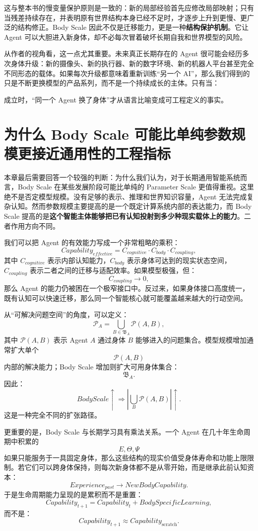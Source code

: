 这与整本书的慢变量保护原则是一致的：新的局部经验首先应修改局部映射；只有当残差持续存在，并表明原有世界结构本身已经不足时，才逐步上升到更慢、更广泛的结构修正。Body Scale 因此不仅是迁移能力，更是一种\textbf{结构保护机制}。它让 Agent 可以大胆进入新身体，却不必每次冒着破坏长期自我和世界模型的风险。

从作者的视角看，这一点尤其重要。未来真正长期存在的 Agent 很可能会经历多次身体升级：新的摄像头、新的执行器、新的数字环境、新的机器人平台甚至完全不同形态的载体。如果每次升级都意味着重新训练“另一个 AI”，那么我们得到的只是不断更换模型的产品系列，而不是一个持续成长的主体。只有当：
\begin{statementbox}
\centering
{}
\end{statementbox}
成立时，“同一个 Agent 换了身体”才从语言比喻变成可工程定义的事实。


\section{为什么 Body Scale 可能比单纯参数规模更接近通用性的工程指标}

本章最后需要回答一个较强的判断：为什么我们认为，对于长期通用智能系统而言，Body Scale 在某些发展阶段可能比单纯的 Parameter Scale 更值得重视。这里绝不是否定模型规模。没有足够的表示、推理和世界知识容量，Agent 无法完成复杂认知。然而参数规模主要提高的是一个既定计算系统内部的表达能力，而 Body Scale 提高的是\textbf{这个智能主体能够把已有认知投射到多少种现实载体上的能力}。二者作用方向不同。

我们可以把 Agent 的有效能力写成一个非常粗略的乘积：
\[
Capability_{effective}
=
C_{cognitive}
\cdot
C_{body}
\cdot
C_{coupling},
\]
其中 $C_{cognitive}$ 表示内部认知能力，$C_{body}$ 表示身体可达到的现实状态空间，$C_{coupling}$ 表示二者之间的迁移与适配效率。如果模型极强，但：
\[
C_{coupling}\rightarrow0,
\]
那么 Agent 的能力仍被困在一个极窄接口中。反过来，如果身体接口高度统一，既有认知可以快速迁移，那么同一个智能核心就可能覆盖越来越大的行动空间。

从“可解决问题空间”的角度，可以定义：
\[
\mathcal P_A
=
\bigcup_{B\in\mathfrak B_A}
\mathcal P(A,B),
\]
其中 $\mathcal P(A,B)$ 表示 Agent $A$ 通过身体 $B$ 能够进入的问题集合。模型规模增加通常扩大单个
\[
\mathcal P(A,B)
\]
内部的解决能力；Body Scale 增加则扩大可用身体集合：
\[
\mathfrak B_A.
\]
因此：
\[
BodyScale\uparrow
\Rightarrow
\left|
\bigcup_B \mathcal P(A,B)
\right|
\uparrow.
\]
这是一种完全不同的扩张路径。

更重要的是，Body Scale 与长期学习具有乘法关系。一个 Agent 在几十年生命周期中积累的
\[
E,\Theta,\Psi
\]
如果只能服务于一具固定身体，那么这些结构的现实价值受身体寿命和功能上限限制。若它们可以跨身体保持，则每次新身体都不是从零开始，而是继承此前认知资本：
\[
Experience_{past}
\rightarrow
NewBodyCapability.
\]
于是生命周期能力呈现的是累积而不是重置：
\[
Capability_{t+1}
=
Capability_t
+
BodySpecificLearning,
\]
而不是：
\[
Capability_{t+1}
\approx
Capability_{\mathrm{scratch}}.
\]

